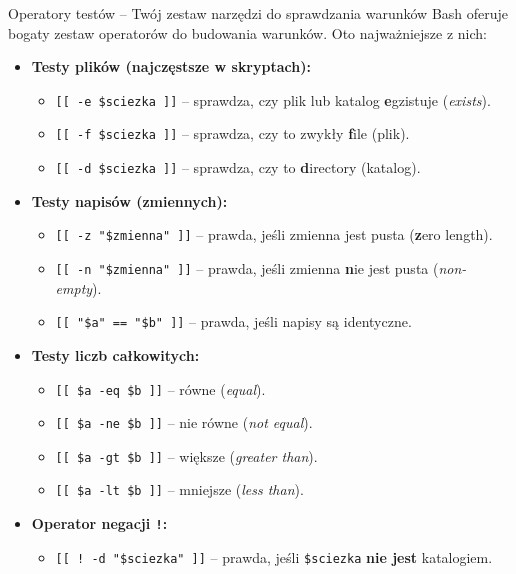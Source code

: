 \begin{importantbox}{Operatory testów – Twój zestaw narzędzi do sprawdzania warunków}
Bash oferuje bogaty zestaw operatorów do budowania warunków. Oto najważniejsze z nich:
\begin{itemize}
    \item \textbf{Testy plików (najczęstsze w skryptach):}
    \begin{itemize}
        \item \texttt{[[ -e \$sciezka ]]} – sprawdza, czy plik lub katalog \textbf{e}gzistuje (\textit{exists}).
        \item \texttt{[[ -f \$sciezka ]]} – sprawdza, czy to zwykły \textbf{f}ile (plik).
        \item \texttt{[[ -d \$sciezka ]]} – sprawdza, czy to \textbf{d}irectory (katalog).
    \end{itemize}
    \item \textbf{Testy napisów (zmiennych):}
    \begin{itemize}
        \item \texttt{[[ -z "\$zmienna" ]]} – prawda, jeśli zmienna jest pusta (\textbf{z}ero length).
        \item \texttt{[[ -n "\$zmienna" ]]} – prawda, jeśli zmienna \textbf{n}ie jest pusta (\textit{non-empty}).
        \item \texttt{[[ "\$a" == "\$b" ]]} – prawda, jeśli napisy są identyczne.
    \end{itemize}
    \item \textbf{Testy liczb całkowitych:}
    \begin{itemize}
        \item \texttt{[[ \$a -eq \$b ]]} – równe (\textit{equal}).
        \item \texttt{[[ \$a -ne \$b ]]} – nie równe (\textit{not equal}).
        \item \texttt{[[ \$a -gt \$b ]]} – większe (\textit{greater than}).
        \item \texttt{[[ \$a -lt \$b ]]} – mniejsze (\textit{less than}).
    \end{itemize}
    \item \textbf{Operator negacji \texttt{!}:}
    \begin{itemize}
        \item \texttt{[[ ! -d "\$sciezka" ]]} – prawda, jeśli \texttt{\$sciezka} \textbf{nie jest} katalogiem.
    \end{itemize}
\end{itemize}
\end{importantbox}


